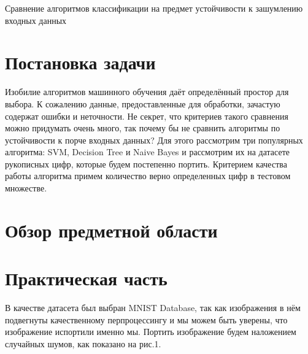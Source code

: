 \documentclass{article}
\begin{document}
\begin{center}
\large{Сравнение алгоритмов классификации на предмет устойчивости к зашумлению входных данных}
\end{center}
\newpage
\section{Постановка задачи}
Изобилие алгоритмов машинного обучения даёт определённый простор для выбора. К сожалению данные, предоставленные для обработки, зачастую содержат ошибки и неточности. Не секрет, что критериев такого сравнения можно придумать очень много, так почему бы не сравнить алгоритмы по устойчивости к порче входных данных? Для этого рассмотрим три популярных алгоритма: SVM, Decision Tree и Naive Bayes и рассмотрим их на датасете рукописных цифр, которые будем постепенно портить. Критерием качества работы алгоритма примем количество верно определенных цифр в тестовом множестве.
\section{Обзор предметной области}
\section{Практическая часть}
В качестве датасета был выбран MNIST Database, так как изображения в нём подвегнуты качественному перпроцессингу и мы можем быть уверены, что изображение испортили именно мы. Портить изображение будем наложением случайных шумов, как показано на рис.1.
\end{document}
